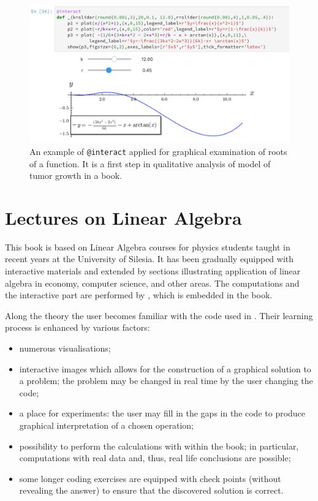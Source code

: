 \documentclass{deliverablereport}
\begin{document}
\begin{figure}
\centerline{\includegraphics[width=.7\textwidth]{interact_npb.png}}
\caption{\label{fig:interact2} An example of \texttt{@interact}
  applied for graphical examination of roots of a function. It is a
  first step in qualitative analysis of model of tumor growth in a
  book.  }
\end{figure}



\section{Lectures on Linear Algebra}

This book is based on Linear Algebra courses for physics students
taught in recent years at the University of Silesia. It has been
gradually equipped with interactive materials and extended by sections
illustrating application of linear algebra in economy, computer
science, and other areas. The computations and the interactive part are
performed by \Sage, which is embedded in the book.

Along the theory the user becomes familiar with the code used in
\Sage. Their learning process is enhanced by various factors:
\begin{itemize}
\item numerous visualisations;
\item interactive images which allows for the construction of a
  graphical solution to a problem; the problem may be changed in real
  time by the user changing the code;
\item a place for experiments: the user may fill in the gaps in the code
  to produce graphical interpretation of a chosen operation;
\item possibility to perform the calculations with \Sage within the
  book; in particular, computations with real data and, thus, real
  life conclusions are possible;
\item some longer coding exercises are equipped with check points
  (without revealing the answer) to ensure that the discovered
  solution is correct.
\end{itemize}
\end{document}
